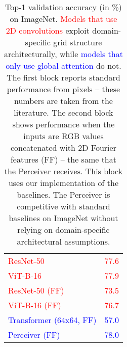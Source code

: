 \documentclass{article}
\begin{document}
\begin{table}[t]
\centering
\begin{tabular}{|l|l|}
\hline
\textcolor{red}{ResNet-50 \cite{he2016deep}}            & \textcolor{red}{77.6}          \\ 
\textcolor{red}{ViT-B-16 \cite{dosovitskiy2020image}}   & \textcolor{red}{77.9}     \\ \hline
\textcolor{red}{ResNet-50 (FF)}                     & \textcolor{red}{73.5}          \\ 
\textcolor{red}{ViT-B-16 (FF)}                      & \textcolor{red}{76.7}          \\ \hline
\textcolor{blue}{Transformer (64x64, FF)}                   & \textcolor{blue}{57.0}          \\ 
\textcolor{blue}{Perceiver (FF)}                             & \textcolor{blue}{78.0}          \\ \hline
\end{tabular}
\caption{Top-1 validation accuracy (in \%) on ImageNet. \textcolor{red}{Models that use 2D convolutions} exploit domain-specific grid structure architecturally, while \textcolor{blue}{models that only use global attention} do not. The first block reports standard performance from pixels -- these numbers are taken from the literature. The second block shows performance when the inputs are RGB values concatenated with 2D Fourier features (FF) -- the same that the Perceiver receives. This block uses our implementation of the baselines. The Perceiver is competitive with standard baselines on ImageNet without relying on domain-specific architectural assumptions.}
\label{tab:imagenet}
\vspace{-12pt}
\end{table}
\end{document}

